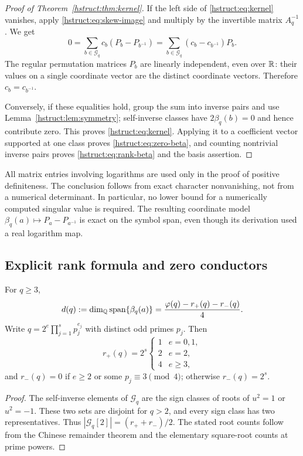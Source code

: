 \begin{proof}[Proof of Theorem~\ref{hstruct:thm:kernel}]
If the left side of \eqref{hstruct:eq:kernel} vanishes, apply
\eqref{hstruct:eq:skew-image} and multiply by the invertible matrix $A_q^{-1}$.
We get
\[
 0=\sum_{b\in \mathcal{G}_q}c_b(P_b-P_{b^{-1}})
 =\sum_{b\in \mathcal{G}_q}(c_b-c_{b^{-1}})P_b.
\]
The regular permutation matrices $P_b$ are linearly independent, even
over $\mathbb R$: their values on a single coordinate vector are the distinct
coordinate vectors. Therefore $c_b=c_{b^{-1}}$.

Conversely, if these equalities hold, group the sum into inverse pairs
and use Lemma~\ref{hstruct:lem:symmetry}; self-inverse classes have
$2\beta_q(b)=0$ and hence contribute zero. This proves
\eqref{hstruct:eq:kernel}. Applying it to a coefficient vector supported at one
class proves \eqref{hstruct:eq:zero-beta}, and counting nontrivial inverse pairs
proves \eqref{hstruct:eq:rank-beta} and the basis assertion.
\end{proof}

\begin{remark}
All matrix entries involving logarithms are used only in the proof of
positive definiteness. The conclusion follows from exact character
nonvanishing, not from a numerical determinant. In particular, no lower
bound for a numerically computed singular value is required. The resulting
coordinate model $\beta_q(a)\mapsto P_a-P_{a^{-1}}$ is exact on the
symbol span, even though its derivation used a real logarithm map.
\end{remark}

\subsection{Explicit rank formula and zero conductors}

\begin{corollary}\label{hstruct:cor:rank-CRT}
For $q\ge3$,
\[
 d(q):=\dim_{\mathbb{Q}}\operatorname{span}\{\beta_q(a)\}
 =\frac{\varphi(q)-r_+(q)-r_-(q)}4.
\]
Write $q=2^e\prod_{j=1}^s p_j^{e_j}$ with distinct odd primes $p_j$.
Then
\[
 r_+(q)=2^s\begin{cases}1&e=0,1,\\2&e=2,\\4&e\ge3,\end{cases}
\]
and $r_-(q)=0$ if $e\ge2$ or some $p_j\equiv3\pmod4$; otherwise
$r_-(q)=2^s$.
\end{corollary}
\begin{proof}
The self-inverse elements of $\mathcal{G}_q$ are the sign classes of roots of
$u^2=1$ or $u^2=-1$. These two sets are disjoint for $q>2$, and every
sign class has two representatives. Thus
$|\mathcal{G}_q[2]|=(r_++r_-)/2$. The stated root counts follow from the Chinese
remainder theorem and the elementary square-root counts at prime powers.
\end{proof}

